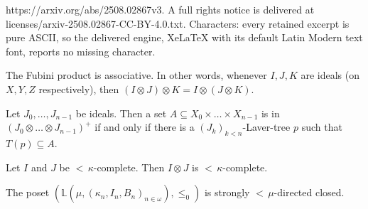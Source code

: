 \documentclass[10pt,a4paper]{amsart}
\newcommand{\dL}{\mathbb{L}}
\begin{document}
https://arxiv.org/abs/2508.02867v3. A full rights notice is delivered at licenses/arxiv-2508.02867-CC-BY-4.0.txt. Characters: every retained excerpt is pure ASCII, so the delivered engine, XeLaTeX with its default Latin Modern text font, reports no missing character.
	\begin{mylem}\label{FubiniAssociative}
		The Fubini product is associative. In other words, whenever $I,J,K$ are ideals (on $X,Y,Z$ respectively), then $(I\otimes J)\otimes K=I\otimes(J\otimes K)$.
	\end{mylem}

	\begin{mylem}\label{ProductTree}
		Let $J_0,\dots,J_{n-1}$ be ideals. Then a set $A\subseteq X_0\times\dots\times X_{n-1}$ is in $(J_0\otimes\dots\otimes J_{n-1})^+$ if and only if there is a $(J_k)_{k<n}$-Laver-tree $p$ such that $T(p)\subseteq A$.
	\end{mylem}

	\begin{mylem}\label{ProductComplete}
		Let $I$ and $J$ be ${<}\,\kappa$-complete. Then $I\otimes J$ is ${<}\,\kappa$-complete.
	\end{mylem}

	\begin{mylem}\label{LClosure}
		The poset $(\dL(\mu,(\kappa_n,I_n,B_n)_{n\in\omega}),\leq_0)$ is strongly ${<}\,\mu$-directed closed.
	\end{mylem}
\end{document}
